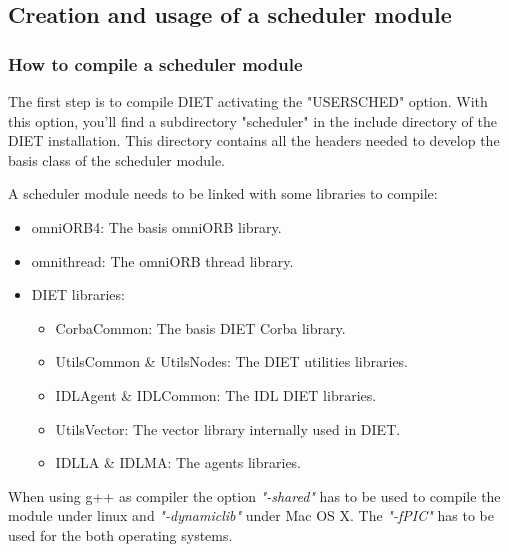 \subsection{Creation and usage of a scheduler module}
\subsubsection{How to compile a scheduler module}
The first step is to compile DIET activating the "USERSCHED" option.
With this option, you'll find a subdirectory "scheduler" in the include
directory of the DIET installation. This directory contains all the headers
needed to develop the basis class of the scheduler module.

A scheduler module needs to be linked with some libraries to compile:\\
\begin{itemize}
  \item omniORB4: The basis omniORB library.
  \item omnithread: The omniORB thread library.
  \item DIET libraries:
    \begin{itemize}
      \item CorbaCommon: The basis DIET Corba library.
      \item UtilsCommon \& UtilsNodes: The DIET utilities libraries.
      \item IDLAgent \& IDLCommon: The IDL DIET libraries.
      \item UtilsVector: The vector library internally used in DIET.
      \item IDLLA \& IDLMA: The agents libraries.
    \end{itemize}
\end{itemize}
When using g++ as compiler the option \textit{"-shared"} has to be used to
compile the module under linux and \textit{"-dynamiclib"} under Mac OS X.
The \textit{"-fPIC"} has to be used for the both operating systems.

